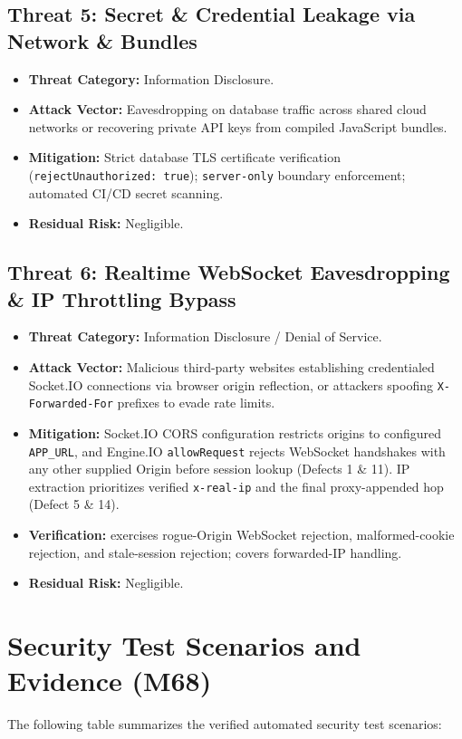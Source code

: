 \documentclass[10pt]{article}
\begin{document}
\subsection{Threat 5: Secret \& Credential Leakage via Network \& Bundles}
\begin{itemize}
  \item \textbf{Threat Category:} Information Disclosure.
  \item \textbf{Attack Vector:} Eavesdropping on database traffic across shared cloud networks or recovering private API keys from compiled JavaScript bundles.
  \item \textbf{Mitigation:} Strict database TLS certificate verification (\texttt{rejectUnauthorized: true}); \texttt{server-only} boundary enforcement; automated CI/CD secret scanning.
  \item \textbf{Residual Risk:} Negligible.
\end{itemize}

\subsection{Threat 6: Realtime WebSocket Eavesdropping \& IP Throttling Bypass}
\begin{itemize}
  \item \textbf{Threat Category:} Information Disclosure / Denial of Service.
  \item \textbf{Attack Vector:} Malicious third-party websites establishing credentialed Socket.IO connections via browser origin reflection, or attackers spoofing \texttt{X-Forwarded-For} prefixes to evade rate limits.
  \item \textbf{Mitigation:} Socket.IO CORS configuration restricts origins to configured \texttt{APP\_URL}, and Engine.IO \texttt{allowRequest} rejects WebSocket handshakes with any other supplied Origin before session lookup (Defects 1 \& 11). IP extraction prioritizes verified \texttt{x-real-ip} and the final proxy-appended hop (Defect 5 \& 14).
  \item \textbf{Verification:}  exercises rogue-Origin WebSocket rejection, malformed-cookie rejection, and stale-session rejection;  covers forwarded-IP handling.
  \item \textbf{Residual Risk:} Negligible.
\end{itemize}

\section{Security Test Scenarios and Evidence (M68)}
The following table summarizes the verified automated security test scenarios:
\end{document}
